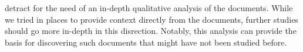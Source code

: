 detract for the need of an in-depth qualitative analysis of the documents. While we tried in places to provide context directly from the documents, further studies should go more in-depth in this disrection. Notably, this analysis can provide the basis for discovering such documents that might have not been studied before. 